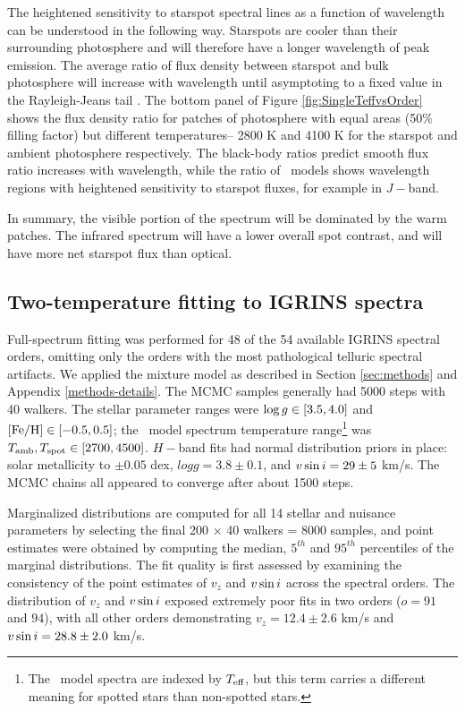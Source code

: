 \documentclass[twocolumn]{emulateapj}%
\begin{document}
The heightened sensitivity to starspot spectral lines as a function of wavelength can be understood in the following way.  Starspots are cooler than their surrounding photosphere and will therefore have a longer wavelength of peak emission.  The average ratio of flux density between starspot and bulk photosphere will increase with wavelength until asymptoting to a fixed value in the Rayleigh-Jeans tail \citep{wolk96}.  The bottom panel of Figure \ref{fig:SingleTeffvsOrder} shows the flux density ratio for patches of photosphere with equal areas (50\% filling factor) but different temperatures-- 2800 K and 4100 K for the starspot and ambient photosphere respectively.  The black-body ratios predict smooth flux ratio increases with wavelength, while the ratio of \PHOENIX\ models shows wavelength regions with heightened sensitivity to starspot fluxes, for example in $J-$band.

In summary, the visible portion of the spectrum will be dominated by the warm patches.  The infrared spectrum will have a lower overall spot contrast, and will have more net starspot flux than optical.

\subsection{Two-temperature fitting to IGRINS spectra}\label{sec:two_tempIGRINS}


Full-spectrum fitting was performed for 48 of the 54 available IGRINS spectral orders, omitting only the orders with the most pathological telluric spectral artifacts. We applied the mixture model as described in Section \ref{sec:methods} and Appendix \ref{methods-details}.  The MCMC samples generally had 5000 steps with 40 walkers.  The stellar parameter ranges were $\log g \in [3.5, 4.0]$ and $[{\rm Fe}/{\rm H}] \in [-0.5, 0.5]$; the \PHOENIX\ model spectrum temperature range\footnote{The \PHOENIX\ model spectra are indexed by $T_\textrm{eff}$, but this term carries a different meaning for spotted stars than non-spotted stars.} was $T_\textrm{amb}, T_\textrm{spot} \in [2700, 4500]$.  $H-$band fits had normal distribution priors in place: solar metallicity to $\pm0.05$ dex, $logg=3.8\pm0.1$, and $v \sin i=29\pm5$ km/s.  The MCMC chains all appeared to converge after about 1500 steps.

Marginalized distributions are computed for all 14 stellar and nuisance parameters by selecting the final 200 $\times$ 40 walkers = 8000 samples, and point estimates were obtained by computing the median, $5^{th}$ and $95^{th}$ percentiles of the marginal distributions.  The fit quality is first assessed by examining the consistency of the point estimates of $v_z$ and $v \sin i$ across the spectral orders.  The distribution of $v_z$ and $v \sin i$ exposed extremely poor fits in two orders ($o=91$ and $94$), with all other orders demonstrating $v_z = 12.4 \pm 2.6$ km/s and $v \sin i = 28.8 \pm 2.0$ km/s.  
\end{document}

